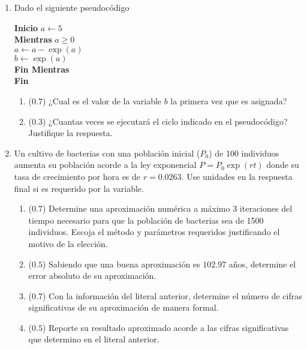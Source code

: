\documentclass[12pt]{article}
\begin{document}
\vspace{-.5cm}
  \begin{enumerate}[leftmargin=*,widest=9]


    \item Dado el siguiente pseudocódigo

\textbf{Inicio}
\(a\gets 5\)\\
\textbf{Mientras} \(a \geq 0\)\\
\hspace*{1cm}\(a \gets a - \exp(a)\)\\
\hspace*{1cm}\(b \gets \exp(a) \)\\
\textbf{Fin Mientras}\\
\textbf{Fin}

\vspace{-0.5cm}

    \begin{enumerate}[label=\alph*]
    \item (\(0.7\)) ¿Cual es el valor de la variable \(b\) la primera vez que es asignada?
\vspace{1.5cm}
    \item (\(0.3\)) ¿Cuantas veces se ejecutará el ciclo indicado en el pseudocódigo? Justifique la respuesta.
\vspace{1.5cm}
    \end{enumerate}


    \item Un cultivo de bacterias con una población inicial (\(P_0\)) de 100 individuos aumenta su población acorde a la ley exponencial \(P = P_0\exp(rt)\) donde su tasa de crecimiento por hora es de \(r=0.0263\). Use unidades en la respuesta final si es requerido por la variable.

    \begin{enumerate}[label=\alph*]
    \item (\(0.7\)) Determine una aproximación numérica a máximo 3 iteraciones del tiempo necesario para que la población de bacterias sea de 1500 individuos. Escoja el método y parámetros requeridos justificando el motivo de la elección.
\vspace*{5cm}
    \item (\(0.5\)) Sabiendo que una buena aproximación es \(102.97\) años, determine el error absoluto de su aproximación.
\vspace{1cm}
    \item (\(0.7\)) Con la información del literal anterior, determine el número de cifras significativas de su aproximación de manera formal.
\vspace{3cm}
\item (\(0.5\)) Reporte su resultado aproximado acorde a las cifras significativas que determino en el literal anterior.
\vspace{0.5cm}
\end{enumerate}


\end{enumerate}
\end{document}
